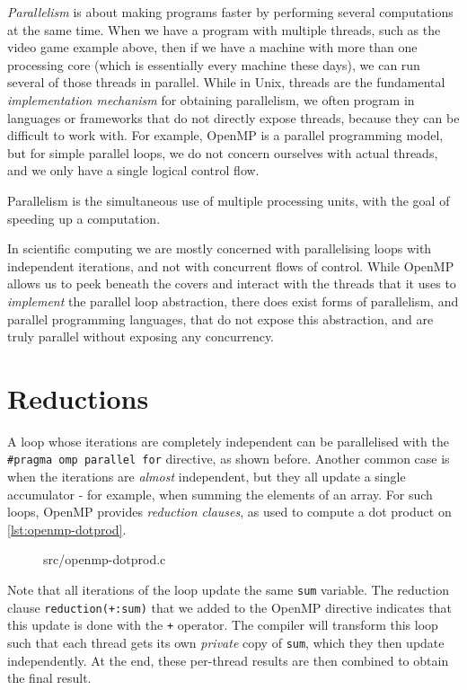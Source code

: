 \emph{Parallelism} is about making programs faster by performing
several computations at the same time.  When we have a program with
multiple threads, such as the video game example above, then if we
have a machine with more than one processing core (which is
essentially every machine these days), we can run several of those
threads in parallel.  While in Unix, threads are the fundamental
\emph{implementation mechanism} for obtaining parallelism, we often
program in languages or frameworks that do not directly expose
threads, because they can be difficult to work with.  For example,
OpenMP is a parallel programming model, but for simple parallel loops,
we do not concern ourselves with actual threads, and we only have a
single logical control flow.

\begin{definition}[Parallelism]
  Parallelism is the simultaneous use of multiple processing units,
  with the goal of speeding up a computation.
\end{definition}

In scientific computing we are mostly concerned with parallelising
loops with independent iterations, and not with concurrent flows of
control.  While OpenMP allows us to peek beneath the covers and
interact with the threads that it uses to \textit{implement} the
parallel loop abstraction, there does exist forms of parallelism, and
parallel programming languages, that do not expose this abstraction,
and are truly parallel without exposing any concurrency.

\section{Reductions}

A loop whose iterations are completely independent can be parallelised
with the \lstinline{#pragma omp parallel for} directive, as shown
before.  Another common case is when the iterations are
\emph{almost} independent, but they all update a single accumulator
- for example, when summing the elements of an array.  For such loops,
OpenMP provides \emph{reduction clauses}, as used to compute a dot
product on \cref{lst:openmp-dotprod}.

\begin{figure}

{src/openmp-dotprod.c}
\end{figure}

Note that all iterations of the loop update the same \texttt{sum}
variable.  The reduction clause \texttt{reduction(+:sum)} that we
added to the OpenMP directive indicates that this update is done with
the \lstinline{+} operator.  The compiler will transform this loop
such that each thread gets its own \emph{private} copy of
\texttt{sum}, which they then update independently.  At the end, these
per-thread results are then combined to obtain the final result.

